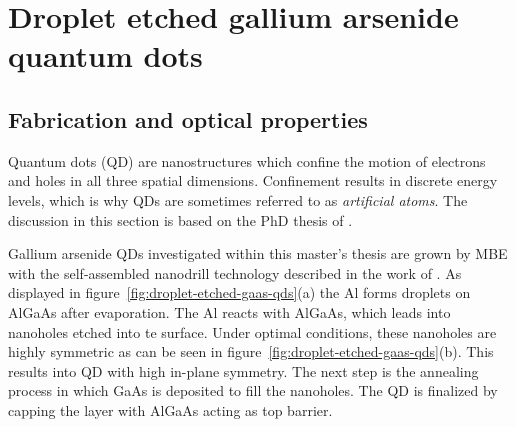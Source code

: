 \chapter{Droplet etched gallium arsenide quantum dots}
\label{chapter:quantum-dot}

\section{Fabrication and optical properties}

Quantum dots (\acs{QD}) are nanostructures which confine the motion of electrons and holes in all three spatial dimensions.
Confinement results in discrete energy levels, which is why \acp{QD} are sometimes referred to as \textit{artificial atoms}.
The discussion in this section is based on the PhD thesis of \textcite{huber_gaas_2019}.

Gallium arsenide \acp{QD} investigated within this master's thesis are grown by \ac{MBE} with the self-assembled nanodrill technology described in the work of \textcite{wang_nanoholes_2007}.
As displayed in figure~\ref{fig:droplet-etched-gaas-qds}(a) the \ac{Al} forms droplets on AlGaAs after evaporation.
The \ac{Al} reacts with AlGaAs, which leads into nanoholes etched into te surface.
Under optimal conditions, these nanoholes are highly symmetric as can be seen in figure~\ref{fig:droplet-etched-gaas-qds}(b). 
This results into \ac{QD} with high in-plane symmetry.
The next step is the annealing process in which \ac{GaAs} is deposited to fill the nanoholes.
The \ac{QD} is finalized by capping the layer with AlGaAs acting as top barrier.

